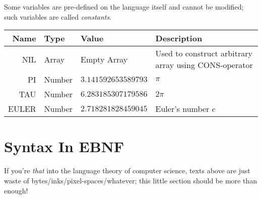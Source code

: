 Some variables are pre-defined on the language itself and cannot be modified; such variables are called \emph{constants}.

\begin{tabulary}{\textwidth}{rllL}
Name & Type & Value & Description \\
\hline
NIL & Array & Empty Array & Used to construct arbitrary array using CONS-operator \\
PI & Number & $3.141592653589793$ & $\pi$ \\
TAU & Number & $6.283185307179586$ & $2 \pi$ \\
EULER & Number & $2.718281828459045$ & Euler's number $e$ \\
\end{tabulary}

\section{Syntax In EBNF}

If you're \emph{that} into the language theory of computer science, texts above are just waste of bytes/inks/pixel-spaces/whatever; this little section should be more than enough!


